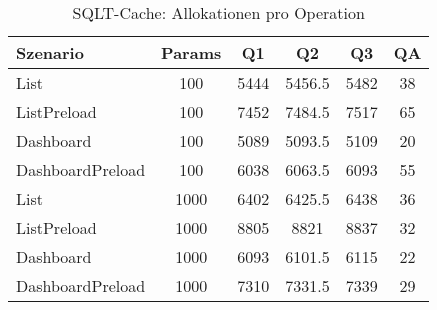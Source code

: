 \begin{table}[ht]
\centering
\caption{SQLT-Cache: Allokationen pro Operation}
\begin{tabular}{lccccc}
\toprule
Szenario & Params & Q1 & Q2 & Q3 & QA \\
\midrule
	List & 100 & 5444 & 5456.5 & 5482 & 38 \\
	ListPreload & 100 & 7452 & 7484.5 & 7517 & 65 \\
	Dashboard & 100 & 5089 & 5093.5 & 5109 & 20 \\
	DashboardPreload & 100 & 6038 & 6063.5 & 6093 & 55 \\
	List & 1000 & 6402 & 6425.5 & 6438 & 36 \\
	ListPreload & 1000 & 8805 & 8821 & 8837 & 32 \\
	Dashboard & 1000 & 6093 & 6101.5 & 6115 & 22 \\
	DashboardPreload & 1000 & 7310 & 7331.5 & 7339 & 29 \\
\bottomrule
\end{tabular}
\label{tab:benchmark_sqlt-cache_allocsperop}
\end{table}
	